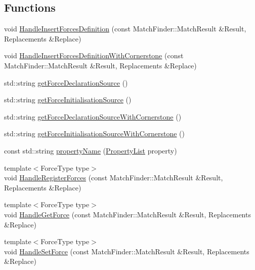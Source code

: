 \subsection*{Functions}
\begin{DoxyCompactItemize}
\item 
void \mbox{\hyperlink{namespacews2st_1_1refactor_1_1forces_a664ea291bdcb81f90151e9ce2a8ed12d}{Handle\+Insert\+Forces\+Definition}} (const Match\+Finder\+::\+Match\+Result \&Result, Replacements \&Replace)
\item 
void \mbox{\hyperlink{namespacews2st_1_1refactor_1_1forces_a0854faeb74d0977f0a889bef65ecc70b}{Handle\+Insert\+Forces\+Definition\+With\+Cornerstone}} (const Match\+Finder\+::\+Match\+Result \&Result, Replacements \&Replace)
\item 
std\+::string \mbox{\hyperlink{namespacews2st_1_1refactor_1_1forces_a9e5d0fb548d813962dbb3647969f4351}{get\+Force\+Declaration\+Source}} ()
\item 
std\+::string \mbox{\hyperlink{namespacews2st_1_1refactor_1_1forces_ac7eb52bdfe754cdbdc6328e288668663}{get\+Force\+Initialisation\+Source}} ()
\item 
std\+::string \mbox{\hyperlink{namespacews2st_1_1refactor_1_1forces_ae81768a1d37b813bb81da88227ebe095}{get\+Force\+Declaration\+Source\+With\+Cornerstone}} ()
\item 
std\+::string \mbox{\hyperlink{namespacews2st_1_1refactor_1_1forces_ac9a46a9f1508ae2a2ecad5f20212642d}{get\+Force\+Initialisation\+Source\+With\+Cornerstone}} ()
\item 
const std\+::string \mbox{\hyperlink{namespacews2st_1_1refactor_1_1forces_a0f39ed859d2d9c4b59894fddd60b1f12}{property\+Name}} (\mbox{\hyperlink{namespacews2st_1_1refactor_1_1forces_aa7768922c14228c573972bab0cea0028}{Property\+List}} property)
\item 
{\footnotesize template$<$Force\+Type type$>$ }\\void \mbox{\hyperlink{namespacews2st_1_1refactor_1_1forces_af8c67c569ff62996a8e4f0d62b29c6a3}{Handle\+Register\+Forces}} (const Match\+Finder\+::\+Match\+Result \&Result, Replacements \&Replace)
\item 
{\footnotesize template$<$Force\+Type type$>$ }\\void \mbox{\hyperlink{namespacews2st_1_1refactor_1_1forces_a0b3b9fb2cd46a777f3b9ce95c9a45376}{Handle\+Get\+Force}} (const Match\+Finder\+::\+Match\+Result \&Result, Replacements \&Replace)
\item 
{\footnotesize template$<$Force\+Type type$>$ }\\void \mbox{\hyperlink{namespacews2st_1_1refactor_1_1forces_a61a15494c227c4aa117339e0d33a05de}{Handle\+Set\+Force}} (const Match\+Finder\+::\+Match\+Result \&Result, Replacements \&Replace)

\end{DoxyCompactItemize}
